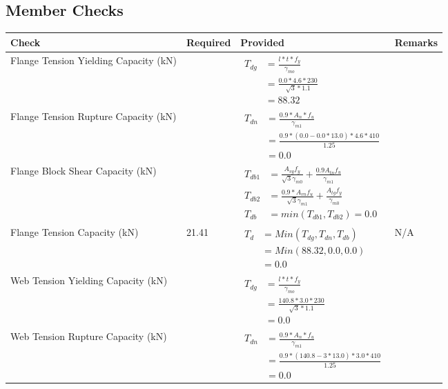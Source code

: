 \documentclass{article}%
\begin{document}
\subsection{Member Checks}%
\label{subsec:MemberChecks}%
\renewcommand{\arraystretch}{1.2}%
\begin{longtable}{|p{4cm}|p{6cm}|p{5.5cm}|p{1.5cm}|}%
\hline%
\rowcolor{OsdagGreen}%
Check&Required&Provided&Remarks\\%
\hline%
\endhead%
\hline%
Flange Tension Yielding Capacity (kN)&&$\begin{aligned} T_{dg} &= \frac{l*t*f_y}{\gamma_{mo}}\\ &=\frac{0.0*4.6*230}{\sqrt{3}*1.1}\\ &=88.32\end{aligned}$&\\%
\hline%
Flange Tension Rupture Capacity (kN)&&$\begin{aligned} T_{dn} &= \frac{0.9*A_{n}*f_u}{\gamma_{m1}}\\ &=\frac{0.9*(0.0-0.0*13.0)*4.6*410}{1.25}\\ &=0.0\end{aligned}$&\\%
\hline%
Flange Block Shear Capacity (kN)&&$\begin{aligned}T_{db1} &= \frac{A_{vg} f_{y}}{\sqrt{3} \gamma_{m0}} + \frac{0.9 A_{tn} f_{u}}{\gamma_{m1}}\\ T_{db2} &= \frac{0.9*A_{vn} f_{u}}{\sqrt{3} \gamma_{m1}} + \frac{A_{tg} f_{y}}{\gamma_{m0}}\\ T_{db} &= min(T_{db1}, T_{db2})= 0.0\end{aligned}$&\\%
\hline%
Flange Tension Capacity (kN)&21.41&$\begin{aligned} T_d &= Min(T_{dg},T_{dn},T_{db})\\ &= Min(88.32,0.0,0.0)\\ &=0.0\end{aligned}$&N/A\\%
\hline%
Web Tension Yielding Capacity (kN)&&$\begin{aligned} T_{dg} &= \frac{l*t*f_y}{\gamma_{mo}}\\ &=\frac{140.8*3.0*230}{\sqrt{3}*1.1}\\ &=0.0\end{aligned}$&\\%
\hline%
Web Tension Rupture Capacity (kN)&&$\begin{aligned} T_{dn} &= \frac{0.9*A_{n}*f_u}{\gamma_{m1}}\\ &=\frac{0.9*(140.8-3*13.0)*3.0*410}{1.25}\\ &=0.0\end{aligned}$&\\%

\end{longtable}
\end{document}
